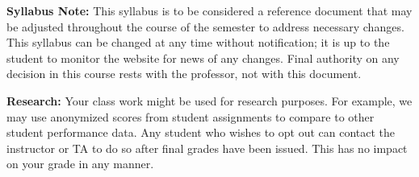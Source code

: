 \documentclass[12pt]{article}
\begin{document}
\textbf{Syllabus Note:} This syllabus is to be considered a reference document that may be adjusted throughout the course of the semester to address necessary changes. This syllabus can be changed at any time without notification; it is up to the student to monitor the website for news of any changes. Final authority on any decision in this course rests with the professor, not with this document.

\textbf{Research:}
Your class work might be used for research purposes. For example, we may use anonymized scores from student assignments to compare to other student performance data. Any student who wishes to opt out can contact the instructor or TA to do so after final grades have been issued. This has no impact on your grade in any manner. 
\end{document}
